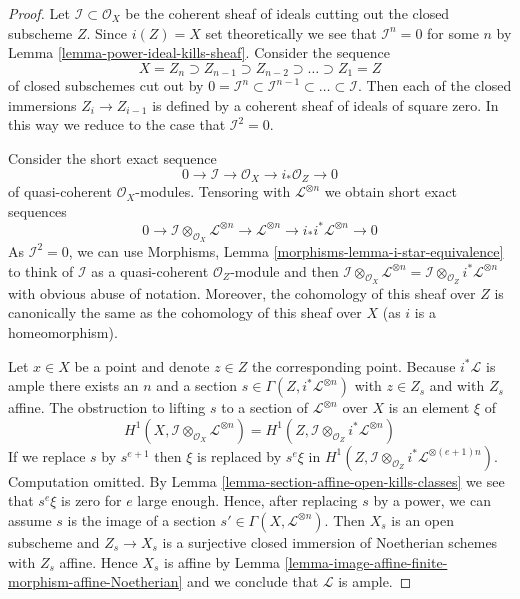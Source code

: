 \begin{proof}
Let $\mathcal{I} \subset \mathcal{O}_X$ be the coherent sheaf of ideals
cutting out the closed subscheme $Z$. Since $i(Z) = X$ set theoretically
we see that $\mathcal{I}^n = 0$ for some $n$ by
Lemma \ref{lemma-power-ideal-kills-sheaf}.
Consider the sequence
$$
X = Z_n \supset Z_{n - 1} \supset Z_{n - 2} \supset \ldots \supset Z_1 = Z
$$
of closed subschemes cut out by
$0 = \mathcal{I}^n \subset \mathcal{I}^{n - 1} \subset \ldots \subset
\mathcal{I}$. Then each of the closed immersions $Z_i \to Z_{i - 1}$
is defined by a coherent sheaf of ideals of square zero. In this way
we reduce to the case that $\mathcal{I}^2 = 0$.

\medskip\noindent
Consider the short exact sequence
$$
0 \to \mathcal{I} \to \mathcal{O}_X \to i_*\mathcal{O}_Z \to 0
$$
of quasi-coherent $\mathcal{O}_X$-modules. Tensoring with
$\mathcal{L}^{\otimes n}$ we obtain short exact sequences
$$
0 \to \mathcal{I} \otimes_{\mathcal{O}_X} \mathcal{L}^{\otimes n}
\to \mathcal{L}^{\otimes n} \to i_*i^*\mathcal{L}^{\otimes n} \to 0
$$
As $\mathcal{I}^2 = 0$, we can use
Morphisms, Lemma \ref{morphisms-lemma-i-star-equivalence}
to think of $\mathcal{I}$ as a quasi-coherent $\mathcal{O}_Z$-module
and then $\mathcal{I} \otimes_{\mathcal{O}_X} \mathcal{L}^{\otimes n} =
\mathcal{I} \otimes_{\mathcal{O}_Z} i^*\mathcal{L}^{\otimes n}$ with
obvious abuse of notation.
Moreover, the cohomology of this sheaf over $Z$ is canonically
the same as the cohomology of this sheaf over $X$ (as $i$ is a
homeomorphism).

\medskip\noindent
Let $x \in X$ be a point and denote $z \in Z$ the corresponding point.
Because $i^*\mathcal{L}$ is ample there exists an $n$ and a section
$s \in \Gamma(Z, i^*\mathcal{L}^{\otimes n})$ with $z \in Z_s$
and with $Z_s$ affine.
The obstruction to lifting $s$ to a section of $\mathcal{L}^{\otimes n}$
over $X$ is an element $\xi$ of
$$
H^1(X, \mathcal{I} \otimes_{\mathcal{O}_X} \mathcal{L}^{\otimes n}) =
H^1(Z, \mathcal{I} \otimes_{\mathcal{O}_Z} i^*\mathcal{L}^{\otimes n})
$$
If we replace $s$ by $s^{e + 1}$ then $\xi$ is replaced by
$s^e \xi$ in $H^1(Z,
\mathcal{I} \otimes_{\mathcal{O}_Z} i^*\mathcal{L}^{\otimes (e + 1)n})$.
Computation omitted. By
Lemma \ref{lemma-section-affine-open-kills-classes}
we see that $s^e \xi$ is zero for $e$ large enough.
Hence, after replacing $s$ by a power, we can assume $s$ is the image
of a section $s' \in \Gamma(X, \mathcal{L}^{\otimes n})$.
Then $X_s$ is an open subscheme and $Z_s \to X_s$ is a surjective
closed immersion of Noetherian schemes with $Z_s$ affine. Hence
$X_s$ is affine by
Lemma \ref{lemma-image-affine-finite-morphism-affine-Noetherian} and
we conclude that $\mathcal{L}$ is ample.
\end{proof}












